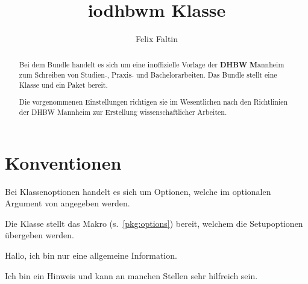 \documentclass[babel=ngerman,highlight=false]{skdoc}
\title{iodhbwm Klasse}
\author{Felix Faltin}
\begin{document}

    \maketitle

    \begin{abstract}
        Bei dem Bundle  handelt es sich um eine \textbf{i}n\textbf{o}ffizielle Vorlage der \textbf{DHBW} \textbf{M}annheim zum Schreiben von Studien-, Praxis- und Bachelorarbeiten. Das Bundle stellt eine Klasse  und ein Paket  bereit.

        Die vorgenommenen Einstellungen richtigen sie im Wesentlichen nach den Richtlinien der DHBW Mannheim zur Erstellung wissenschaftlicher Arbeiten.
    \end{abstract}


    \tableofcontents
    
    \section{Konventionen}
    
    \begin{description}[leftmargin=!, labelwidth=3.5cm]
        \item[\classOption{Klassenoptionen}] Bei Klassenoptionen handelt es sich um Optionen, welche im optionalen Argument von  angegeben werden.
        \item[\setupOption{Setupoption}] Die Klasse stellt das Makro \Macro\dhbwsetup (s.~\ref{pkg:options}) bereit, welchem die Setupoptionen übergeben werden.
    \end{description}

    \begin{info}{}
        Hallo, ich bin nur eine allgemeine Information.
    \end{info}

    \begin{hint}{}
        Ich bin ein Hinweis und kann an manchen Stellen sehr hilfreich sein.
    \end{hint}
\end{document}
